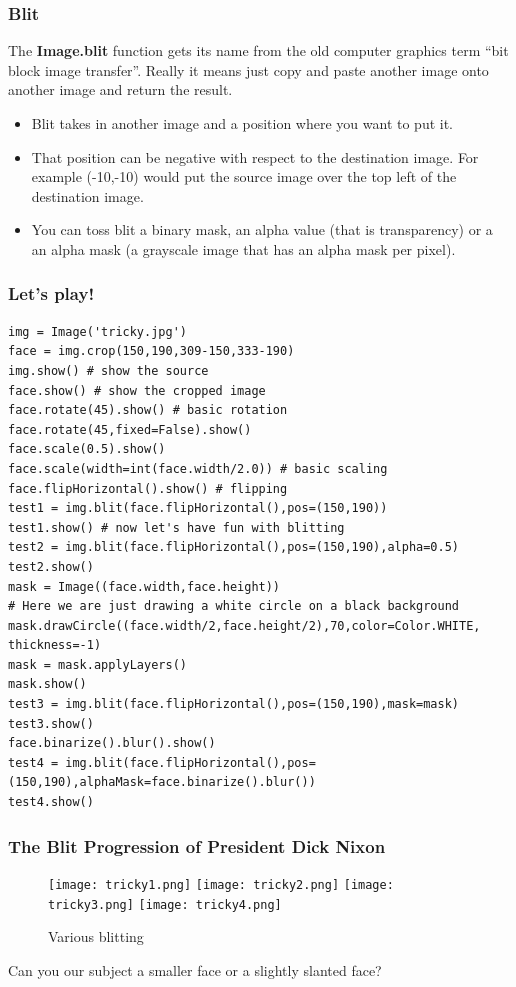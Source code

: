 \documentclass{beamer}
\begin{document}
\begin{frame}
\frametitle{Blit}
The \textbf{Image.blit} function gets its name from the old computer graphics term ``bit block image
transfer''. Really it means just copy and paste another image onto
another image and return the result.
\begin{itemize}
\item Blit takes in another image and a position where you want to put
  it.
\item That position can be negative with respect to the destination
  image. For example (-10,-10) would put the source image over the top
  left of the destination image.
\item You can toss blit a binary mask, an alpha value (that is
  transparency) or a an alpha mask (a grayscale image that has an
  alpha mask per pixel).
\end{itemize}
\end{frame}
\begin{frame}[fragile] 
\frametitle{Let's play!}
\begin{example}
\begin{verbatim}
img = Image('tricky.jpg')
face = img.crop(150,190,309-150,333-190)
img.show() # show the source
face.show() # show the cropped image
face.rotate(45).show() # basic rotation
face.rotate(45,fixed=False).show()
face.scale(0.5).show()
face.scale(width=int(face.width/2.0)) # basic scaling
face.flipHorizontal().show() # flipping
test1 = img.blit(face.flipHorizontal(),pos=(150,190))
test1.show() # now let's have fun with blitting
test2 = img.blit(face.flipHorizontal(),pos=(150,190),alpha=0.5)
test2.show() 
mask = Image((face.width,face.height))
# Here we are just drawing a white circle on a black background
mask.drawCircle((face.width/2,face.height/2),70,color=Color.WHITE, thickness=-1)
mask = mask.applyLayers()
mask.show()
test3 = img.blit(face.flipHorizontal(),pos=(150,190),mask=mask)
test3.show()
face.binarize().blur().show()
test4 = img.blit(face.flipHorizontal(),pos=(150,190),alphaMask=face.binarize().blur())
test4.show()
\end{verbatim}
\end{example}
\end{frame}
\begin{frame}
\frametitle{The Blit Progression of President Dick Nixon}
 \begin{figure}
     \texttt{[image: tricky1.png]}
     \quad
     \texttt{[image: tricky2.png]}
     \quad
     \texttt{[image: tricky3.png]}
     \quad
     \texttt{[image: tricky4.png]}
     \quad
     \caption{Various blitting}
 \end{figure}
\large{Can you our subject a smaller face or a slightly slanted face? }
\end{frame}
\end{document}
